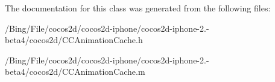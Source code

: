 The documentation for this class was generated from the following files\-:\begin{DoxyCompactItemize}
\item 
/\-Bing/\-File/cocos2d/cocos2d-\/iphone/cocos2d-\/iphone-\/2.-\/beta4/cocos2d/C\-C\-Animation\-Cache.\-h\item 
/\-Bing/\-File/cocos2d/cocos2d-\/iphone/cocos2d-\/iphone-\/2.-\/beta4/cocos2d/C\-C\-Animation\-Cache.\-m\end{DoxyCompactItemize}
